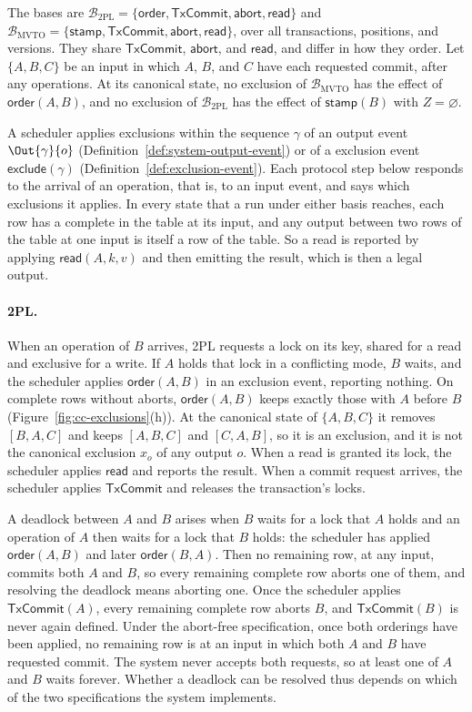 The bases are
$\mathcal B_{\mathrm{2PL}}=\{\mathsf{order},\mathsf{TxCommit},\mathsf{abort},\mathsf{read}\}$
and
$\mathcal B_{\mathrm{MVTO}}=\{\mathsf{stamp},\mathsf{TxCommit},\mathsf{abort},\mathsf{read}\}$,
over all transactions, positions, and versions.  They share
$\mathsf{TxCommit}$, $\mathsf{abort}$, and $\mathsf{read}$, and differ in how
they order.  Let $\{A,B,C\}$ be an input in which $A$, $B$, and $C$ have each
requested commit, after any operations.  At its canonical state, no exclusion
of $\mathcal B_{\mathrm{MVTO}}$ has the effect of $\mathsf{order}(A,B)$, and no
exclusion of $\mathcal B_{\mathrm{2PL}}$ has the effect of $\mathsf{stamp}(B)$
with $Z=\varnothing$.

A scheduler applies exclusions within the sequence $\gamma$ of an output
event $\Out{\gamma}{o}$ (Definition~\ref{def:system-output-event}) or of a
exclusion event $\mathsf{exclude}(\gamma)$
(Definition~\ref{def:exclusion-event}).  Each protocol step below responds to
the arrival of an operation, that is, to an input event, and says which
exclusions it applies.  In every state that a run under either basis reaches,
each row has a complete \outnoun in the table at its input, and any output
between two rows of the table at one input is itself a row of the table.  So a
read is reported by applying $\mathsf{read}(A,k,v)$ and then emitting the
result, which is then a legal output.

\paragraph{2PL.}
When an operation of $B$ arrives, 2PL requests a lock on its key, shared for a
read and exclusive for a write.  If $A$ holds that lock in a conflicting mode,
$B$ waits, and the scheduler applies $\mathsf{order}(A,B)$ in an exclusion
event, reporting nothing.  On complete rows without aborts,
$\mathsf{order}(A,B)$ keeps exactly those with $A$ before $B$
(Figure~\ref{fig:cc-exclusions}(h)).  At the canonical state of $\{A,B,C\}$ it
removes $[B,A,C]$ and keeps $[A,B,C]$ and $[C,A,B]$, so it is an exclusion, and it
is not the canonical exclusion $x_o$ of any output $o$.  When a read is granted its lock,
the scheduler applies $\mathsf{read}$ and reports the result.  When a commit
request arrives, the scheduler applies $\mathsf{TxCommit}$ and releases the
transaction's locks.

A deadlock between $A$ and $B$ arises when $B$ waits for a lock that $A$ holds
and an operation of $A$ then waits for a lock that $B$ holds: the scheduler has
applied $\mathsf{order}(A,B)$ and later $\mathsf{order}(B,A)$.  Then no
remaining row, at any input, commits both $A$ and $B$, so every remaining
complete row aborts one of them, and resolving the deadlock means aborting one.
Once the scheduler applies $\mathsf{TxCommit}(A)$, every remaining complete row
aborts $B$, and $\mathsf{TxCommit}(B)$ is never again defined.  Under the
abort-free specification, once both orderings have been applied, no remaining
row is at an input in which both $A$ and $B$ have requested commit.  The system
never accepts both requests, so at least one of $A$ and $B$ waits forever.
Whether a deadlock can be resolved thus depends on which of the two
specifications the system implements.

